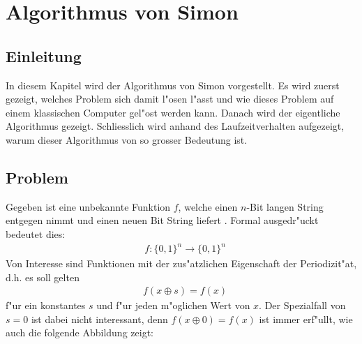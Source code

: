 \chapter{Algorithmus von Simon\label{chapter:simon}} 
\begin{refsection}

\section{Einleitung}
In diesem Kapitel wird der Algorithmus von Simon vorgestellt.  Es wird zuerst
gezeigt, welches Problem sich damit l"osen l"asst und wie dieses Problem auf
einem klassischen Computer gel"ost werden kann. Danach wird der eigentliche
Algorithmus gezeigt. Schliesslich wird anhand des Laufzeitverhalten aufgezeigt,
warum dieser Algorithmus von so grosser Bedeutung ist.
\section{Problem}
Gegeben ist eine unbekannte Funktion $f$, welche einen $n$-Bit langen String
entgegen nimmt und einen neuen Bit String liefert
\cite{simon:cse599d-dave-bacon}. Formal ausgedr"uckt bedeutet dies:
\begin{align*}
  &f\colon\{0,1\}^n\to\{0,1\}^n
\end{align*}
Von Interesse sind Funktionen mit der zus"atzlichen Eigenschaft der
Periodizit"at, d.h. es soll gelten
\begin{align*}
  &f(x \oplus s) = f(x)
\end{align*}
f"ur ein konstantes $s$ und f"ur jeden m"oglichen Wert von $x$. 
Der Spezialfall von $s = 0$ ist dabei nicht interessant, denn $f(x \oplus 0)
= f(x)$ ist immer erf"ullt, wie auch die folgende Abbildung zeigt:
\begin{figure}[H]
 \centering
\end{figure}
\end{refsection}
